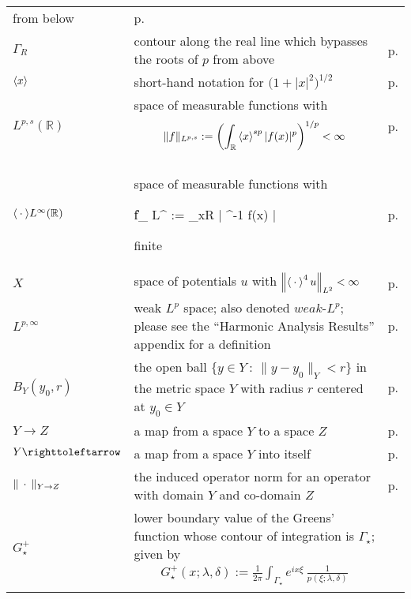 \documentclass[../dissertation.tex]{subfiles}
\begin{document}
\begin{centering}
\begin{longtable}{R{.115\textwidth}|L{.74\textwidth}|C{.145\textwidth}}
		from below
		& p.\pageref{sym:Gamma} \\
	${\Gamma_R}$ & contour along the real line which bypasses the roots of $p$
		from above
		& p.\pageref{sym:Gamma} \\
	$\left\langle x \right\rangle$ & short-hand notation for $\big(1 + |x|^2\big)^{1/2}$
		& p.\pageref{sym:xbracket} \\
	$L^{p,s}(\mathbb R)$ & space of measurable functions with 
		\[
			\|f\|_{L^{p,s}}
				:= \left(\int_{\mathbb R} \left\langle x \right\rangle^{sp} |f(x)|^p \right)^{1/p}
				< \infty
		\]
		& p.\pageref{defn2:Lps} \\
	$\langle\kern 0.5ex \cdot \kern 0.5ex\rangle L^\infty(\mathbb R)$ & space of measurable functions with 
		\begin{talign}
			\|f\|_{\inn{\dotarg} L^\infty}
				:= \esssup_{x\in \mathbb R} \left| ^{-1} f(x)  \right|
		\end{talign}
		finite
		& p.\pageref{defn2:wLp} \\
	$X$ & space of potentials $u$ with $\left\| \left\langle \kern 0.5ex \cdot \kern 0.5ex \right\rangle^{4} u \right\|_{L^2} < \infty$
		& p.\pageref{defn2:X} \\
	$L^{p,\infty}$ & weak $L^p$ space; also denoted $weak$-$L^p$; please see
		the ``Harmonic Analysis Results'' appendix for a definition
		& p.\pageref{sym:weakLp}\\
	$B_Y(y_0, r)$ & the open ball $\{ y \in Y ~:~ \|y - y_0\|_Y < r  \}$ in 
		the metric space $Y$ with radius $r$ centered at $y_0 \in Y$
		& p.\pageref{sym:ball} \\
	$Y\to Z$ & a map from a space $Y$ to a space $Z$
		& p.\pageref{sym:mapsto} \\
	$Y \toitself$ & a map from a space $Y$ into itself
		& p.\pageref{sym:toitself} \\
	$\|\kern 0.5ex \cdot \kern 0.5ex\|_{Y\to Z}$ & the induced operator norm for an operator with domain 
		$Y$ and co-domain $Z$
		& p.\pageref{sym:opnorm} \\
	$G_\star^+$ & lower boundary value of the Greens' function whose contour
		of integration is $\Gamma_\star$; given by 
			{
			\begin{align*}
					G_\star^+(x; \lambda, \delta)
						:=
							\frac{1}{2\pi} 
							\int_{\Gamma_\star}
								e^{i x \xi} \,
								\frac{1}{p(\xi; \lambda, \delta)}

\end{align*}}
\end{longtable}
\end{centering}
\end{document}
